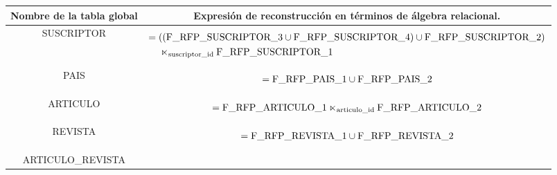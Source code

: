 \documentclass{article}
\begin{document}
\begin{table}[h!]
\def\arraystretch{2}
\begin{tabular}{|c|c|}
\hline
Nombre de la tabla global & Expresión de reconstrucción en términos de álgebra 
relacional. \\ \hline
SUSCRIPTOR   &
\begin{minipage}[b]{13cm}
    \begin{equation*} 
    \begin{aligned}
        =\; & ((\text{F\_RFP\_SUSCRIPTOR\_3}\cup 
        \text{F\_RFP\_SUSCRIPTOR\_4}) \cup \text{F\_RFP\_SUSCRIPTOR\_2}) 
        \\ & \ltimes_{\text{suscriptor\_id}}  \text{F\_RFP\_SUSCRIPTOR\_1}
    \end{aligned}
    \end{equation*}
\end{minipage}
\\ \hline
PAIS   &
\begin{minipage}[b]{13cm}
    \begin{equation*} 
    \begin{aligned}
        = \text{F\_RFP\_PAIS\_1} \cup \text{F\_RFP\_PAIS\_2}
    \end{aligned}
    \end{equation*}
\end{minipage}
\\ \hline
ARTICULO   &
\begin{minipage}[b]{13cm}
    \begin{equation*} 
    \begin{aligned}
        = \text{F\_RFP\_ARTICULO\_1} \ltimes_{\text{articulo\_id}}
        \text{F\_RFP\_ARTICULO\_2}
    \end{aligned}
    \end{equation*}
\end{minipage}
\\ \hline
REVISTA   &
\begin{minipage}[b]{13cm}
    \begin{equation*} 
    \begin{aligned}
        = \text{F\_RFP\_REVISTA\_1} \cup \text{F\_RFP\_REVISTA\_2}
    \end{aligned}
    \end{equation*}
\end{minipage}
\\ \hline
ARTICULO\_REVISTA   &
\begin{minipage}[b]{13cm}

\end{minipage}
\end{tabular}
\end{table}
\end{document}
